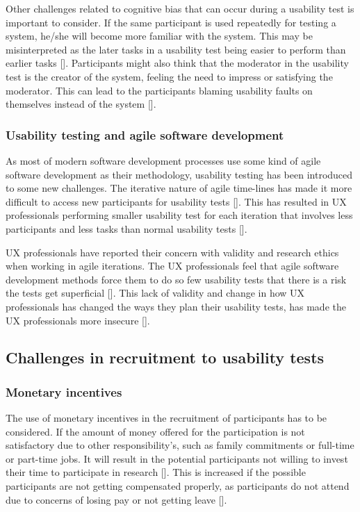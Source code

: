 Other challenges related to cognitive bias that can occur during a usability test is important to consider. If the same participant is used repeatedly for testing a system, he/she will become more familiar with the system. This may be misinterpreted as the later tasks in a usability test being easier to perform than earlier tasks [\cite{dn_2016}]. Participants might also think that the moderator in the usability test is the creator of the system, feeling the need to impress or satisfying the moderator. This can lead to the participants blaming usability faults on themselves instead of the system [\cite{dn_2016}].

\subsubsection{Usability testing and agile software development}
As most of modern software development processes use some kind of agile software development as their methodology, usability testing has been introduced to some new challenges. The iterative nature of agile time-lines has made it more difficult to access new participants for usability tests [\cite{ds_2014}]. This has resulted in UX professionals performing smaller usability test for each iteration that involves less participants and less tasks than normal usability tests [\cite{ln_2012}].

UX professionals have reported their concern with validity and research ethics when working in agile iterations. The UX professionals feel that agile software development methods force them to do so few usability tests that there is a risk the tests get superficial [\cite{ln_2012}]. This lack of validity and change in how UX professionals has changed the ways they plan their usability tests, has made the UX professionals more insecure [\cite{ln_2012}].

\subsection{Challenges in recruitment to usability tests}

\subsubsection{Monetary incentives} \label{sec:monetary-incentives}
The use of monetary incentives in the recruitment of participants has to be considered. If the amount of money offered for the participation is not satisfactory due to other responsibility's, such as family commitments or full-time or part-time jobs. It will result in the potential participants not willing to invest their time to participate in research [\cite{pkf_2018}]. This is increased if the possible participants are not getting compensated properly, as participants do not attend due to concerns of losing pay or not getting leave [\cite{nc_2020}].

